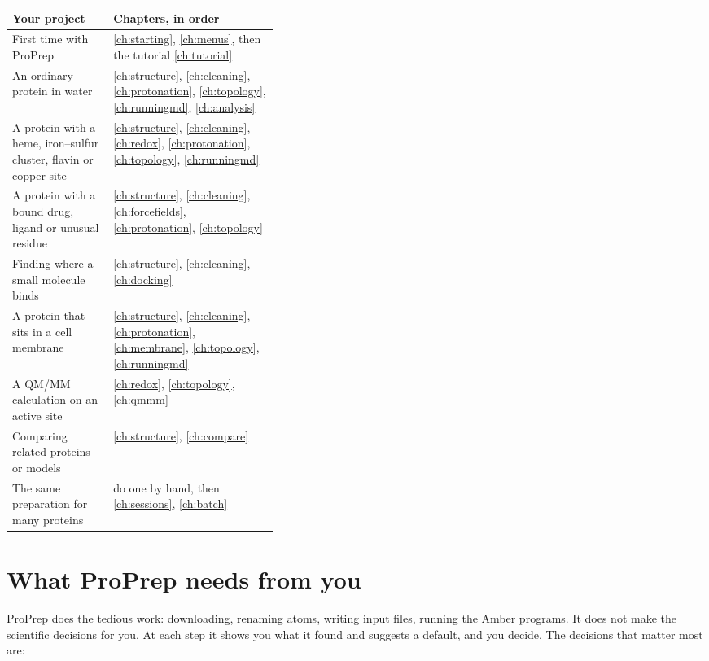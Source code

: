 \begin{center}
\begin{tabularx}{\linewidth}{@{}>{\raggedright\arraybackslash}p{0.38\linewidth}L@{}}
\toprule
\textbf{Your project} & \textbf{Chapters, in order} \\
\midrule
First time with ProPrep & \ref{ch:starting}, \ref{ch:menus}, then the tutorial \ref{ch:tutorial} \\
An ordinary protein in water & \ref{ch:structure}, \ref{ch:cleaning}, \ref{ch:protonation},
  \ref{ch:topology}, \ref{ch:runningmd}, \ref{ch:analysis} \\
A protein with a heme, iron--sulfur cluster, flavin or copper site &
  \ref{ch:structure}, \ref{ch:cleaning}, \ref{ch:redox}, \ref{ch:protonation},
  \ref{ch:topology}, \ref{ch:runningmd} \\
A protein with a bound drug, ligand or unusual residue &
  \ref{ch:structure}, \ref{ch:cleaning}, \ref{ch:forcefields}, \ref{ch:protonation},
  \ref{ch:topology} \\
Finding where a small molecule binds & \ref{ch:structure}, \ref{ch:cleaning}, \ref{ch:docking} \\
A protein that sits in a cell membrane & \ref{ch:structure}, \ref{ch:cleaning},
  \ref{ch:protonation}, \ref{ch:membrane}, \ref{ch:topology}, \ref{ch:runningmd} \\
A QM/MM calculation on an active site & \ref{ch:redox}, \ref{ch:topology}, \ref{ch:qmmm} \\
Comparing related proteins or models & \ref{ch:structure}, \ref{ch:compare} \\
The same preparation for many proteins & do one by hand, then \ref{ch:sessions}, \ref{ch:batch} \\
\bottomrule
\end{tabularx}
\end{center}

\section{What ProPrep needs from you}
\label{sec:bigpicture-decisions}

ProPrep does the tedious work: downloading, renaming atoms, writing input files,
running the Amber programs. It does not make the scientific decisions for you.
At each step it shows you what it found and suggests a default, and you decide.
The decisions that matter most are:

